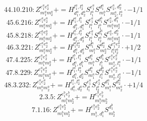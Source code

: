 \documentclass[letterpaper,10pt,fleqn,leqno,onecolumn]{article}
\begin{document}
\begin{equation} \;\;\;\;\;\;  44.10.210: Z^{e_{1}^{a}e_{2}^{a}}_{m_{1}^{a}m_{2}^{a}}+=H^{l_{1}^{a},l_{2}^{a}}_{d_{1}^{a},d_{2}^{a}}S^{e_{1}^{a}}_{l_{1}^{a}}S^{d_{1}^{a}}_{m_{1}^{a}}S^{e_{2}^{a},d_{2}^{a}}_{m_{2}^{a},l_{2}^{a}}\cdot -1/1 \end{equation}
\begin{equation} \;\;\;\;\;\;  45.6.216: Z^{e_{1}^{a}e_{2}^{a}}_{m_{1}^{a}m_{2}^{a}}+=H^{l_{1}^{a},l_{1}^{b}}_{d_{1}^{b},d_{1}^{a}}S^{e_{1}^{a}}_{l_{1}^{a}}S^{d_{1}^{b}}_{l_{1}^{b}}S^{e_{2}^{a},d_{1}^{a}}_{m_{1}^{a}m_{2}^{a}}\cdot -1/1 \end{equation}
\begin{equation} \;\;\;\;\;\;  45.8.218: Z^{e_{1}^{a}e_{2}^{a}}_{m_{1}^{a}m_{2}^{a}}+=H^{l_{1}^{a},l_{2}^{a}}_{d_{1}^{a},d_{2}^{a}}S^{e_{1}^{a}}_{l_{1}^{a}}S^{d_{1}^{a}}_{l_{2}^{a}}S^{e_{2}^{a},d_{2}^{a}}_{m_{1}^{a}m_{2}^{a}}\cdot -1/1 \end{equation}
\begin{equation} \;\;\;\;\;\;  46.3.221: Z^{e_{1}^{a}e_{2}^{a}}_{m_{1}^{a}m_{2}^{a}}+=H^{l_{1}^{a}l_{2}^{a}}_{d_{1}^{a},d_{2}^{a}}S^{d_{1}^{a}}_{m_{1}^{a}}S^{d_{2}^{a}}_{m_{2}^{a}}S^{e_{1}^{a}e_{2}^{a}}_{l_{1}^{a}l_{2}^{a}}\cdot +1/2 \end{equation}
\begin{equation} \;\;\;\;\;\;  47.4.225: Z^{e_{1}^{a}e_{2}^{a}}_{m_{1}^{a}m_{2}^{a}}+=H^{l_{1}^{b},l_{1}^{a}}_{d_{1}^{a},d_{1}^{b}}S^{d_{1}^{a}}_{m_{1}^{a}}S^{d_{1}^{b}}_{l_{1}^{b}}S^{e_{1}^{a}e_{2}^{a}}_{m_{2}^{a},l_{1}^{a}}\cdot -1/1 \end{equation}
\begin{equation} \;\;\;\;\;\;  47.8.229: Z^{e_{1}^{a}e_{2}^{a}}_{m_{1}^{a}m_{2}^{a}}+=H^{l_{1}^{a},l_{2}^{a}}_{d_{1}^{a},d_{2}^{a}}S^{d_{1}^{a}}_{m_{1}^{a}}S^{d_{2}^{a}}_{l_{1}^{a}}S^{e_{1}^{a}e_{2}^{a}}_{m_{2}^{a},l_{2}^{a}}\cdot -1/1 \end{equation}
\begin{equation} \;\;\;\;\;\;  48.3.232: Z^{e_{1}^{a}e_{2}^{a}}_{m_{1}^{a}m_{2}^{a}}+=H^{l_{1}^{a},l_{2}^{a}}_{d_{1}^{a},d_{2}^{a}}S^{e_{1}^{a}}_{l_{1}^{a}}S^{e_{2}^{a}}_{l_{2}^{a}}S^{d_{1}^{a}}_{m_{1}^{a}}S^{d_{2}^{a}}_{m_{2}^{a}}\cdot +1/4 \end{equation}
\begin{equation} \;\;\;\;\;\;  2.3.5: Z^{e_{1}^{b}e_{2}^{b}}_{m_{1}^{b}m_{2}^{b}}+=H^{e_{1}^{b}e_{2}^{b}}_{m_{1}^{b}m_{2}^{b}} \end{equation}
\begin{equation} \;\;\;\;\;\;  7.1.16: Z^{e_{1}^{b}e_{2}^{b}}_{m_{1}^{b}m_{2}^{b}}+=H^{e_{1}^{b}e_{2}^{b}}_{m_{1}^{b},d_{1}^{b}}S^{d_{1}^{b}}_{m_{2}^{b}} \end{equation}
\end{document}
